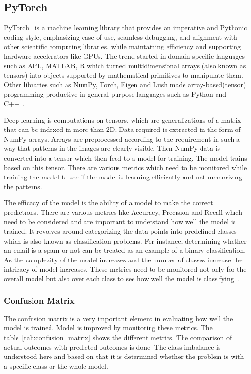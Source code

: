 \subsection{PyTorch}\label{sec:PyTorch}
PyTorch~\cite{PyTorch_website} is a machine learning library that provides an imperative and Pythonic coding style, emphasizing ease of use, seamless debugging, and alignment with other scientific computing libraries, while maintaining efficiency and supporting hardware accelerators like GPUs. The trend started in domain specific languages such as APL, MATLAB, R which turned multidimensional arrays (also known as tensors) into objects supported by mathematical primitives to manipulate them. Other libraries such as NumPy, Torch, Eigen and Lush made array-based(tensor) programming productive in general purpose languages such as Python and C++~\cite{pytorch}. 

Deep learning is computations on tensors, which are generalizations of a matrix that can be indexed in more than 2D. Data required is extracted in the form of NumPy arrays. Arrays are preprocessed according to the requirement in such a way that patterns in the images are clearly visible. Then NumPy data is converted into a tensor which then feed to a model for training. The model trains based on this tensor. There are various metrics which need to be monitored while training the model to see if the model is learning efficiently and not memorizing the patterns. 

The efficacy of the model is the ability of a model to make the correct predictions. There are various metrics like Accuracy, Precision and Recall which need to be considered and are important to understand how well the model is trained. It revolves around categorizing the data points into predefined classes which is also known as classification problems. For instance, determining whether an email is a spam or not can be treated as an example of a binary classification. As the complexity of the model increases and the number of classes increase the intricacy of model increases. These metrics need to be monitored not only for the overall model but also over each class to see how well the model is classifying~\cite{Efficacy}. 

\subsubsection{Confusion Matrix}
The confusion matrix is a very important element in evaluating how well the model is trained. Model is improved by monitoring these metrics. The table~\ref{tab:confusion_matrix} shows the different metrics. The comparison of actual outcomes with predicted outcomes is done. The class imbalance is understood here and based on that it is determined whether the problem is with a specific class or the whole model. 

